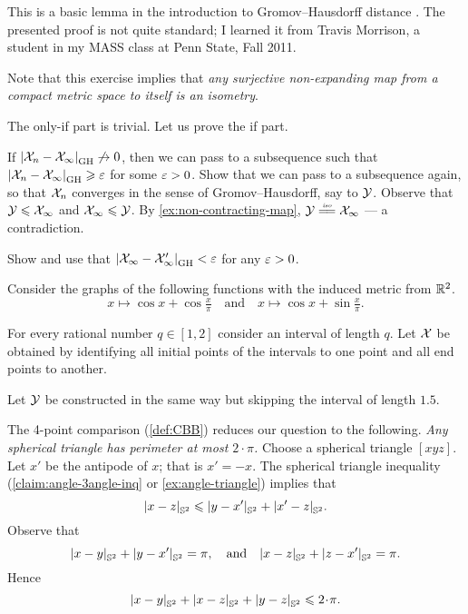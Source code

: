 This is a basic lemma in the introduction to Gromov--Hausdorff distance \cite[see 7.3.30 in][]{burago-burago-ivanov}.
The presented proof is not quite standard;
I learned it from Travis Morrison, 
a student in my MASS class at Penn State, Fall 2011.

Note that this exercise implies that \textit{any surjective non-expanding map from a compact metric space to itself is an isometry}.

The only-if part is trivial. 
Let us prove the if part.

If $|{\mathcal{X}_n}-{\mathcal{X}_\infty}|_{\operatorname{\rm GH}\nolimits}^{{}}\not\to 0$, then we can pass to a subsequence such that $|{\mathcal{X}_n}-{\mathcal{X}_\infty}|_{\operatorname{\rm GH}\nolimits}^{{}}\geqslant\varepsilon$ for some $\varepsilon>0$.
Show that we can pass to a subsequence again, so that $\mathcal{X}_n$ converges in the sense of Gromov--Hausdorff, say to $\mathcal{Y}$.
Observe that $\mathcal{Y}\leqslant \mathcal{X}_\infty$ and $\mathcal{X}_\infty\leqslant\mathcal{Y}$.
By \ref{ex:non-contracting-map}, $\spc{Y}\iso \spc{X}_\infty$ --- a contradiction.

 Show and use that $|{\mathcal{X}_\infty}-{\mathcal{X}_\infty'}|_{\operatorname{\rm GH}\nolimits}^{{}}<\varepsilon$ for any $\varepsilon>0$.



 \parit{\ref{SHORT.ex:GH-noncompact:proper}}
 Consider the graphs of the following functions with the induced metric from $\mathbb{R}^2$.
\[
x\mapsto \cos x+\cos \tfrac x\pi
\quad\text{and}\quad
x\mapsto \cos x+\sin \tfrac x\pi.
\]


\parit{\ref{SHORT.ex:GH-noncompact:bounded}}
For every rational number  $q\in[1,2]$ consider an interval of length $q$. Let $\mathcal{X}$ be obtained by identifying all  initial points of  the intervals to one point and all  end points to another.

Let $\mathcal{Y}$ be constructed in the same way but skipping the interval of length $1.5$.



The 4-point comparison (\ref{def:CBB}) reduces our question to the following.
\textit{Any spherical triangle has perimeter at most $2\cdot\pi$.}
Choose a spherical triangle $[xyz]$.
Let $x'$ be the antipode of $x$; that is $x'=-x$.
The spherical triangle inequality (\ref{claim:angle-3angle-inq} or \ref{ex:angle-triangle}) implies that
\[|{x}-{z}|_{\mathbb{S}^2}^{{}}\leqslant |{y}-{x'}|_{\mathbb{S}^2}^{{}}+|{x'}-{z}|_{\mathbb{S}^2}^{{}}.\]
Observe that 
\[
|{x}-{y}|_{\mathbb{S}^2}^{{}}+|{y}-{x'}|_{\mathbb{S}^2}^{{}}=\pi,
\quad\text{and}\quad
|{x}-{z}|_{\mathbb{S}^2}^{{}}+|{z}-{x'}|_{\mathbb{S}^2}^{{}}=\pi.
\]
Hence
\[\dist{x}{y}{\mathbb{S}^2}+\dist{x}{z}{\mathbb{S}^2}+\dist{y}{z}{\mathbb{S}^2}\le2\cdot \pi.\]

